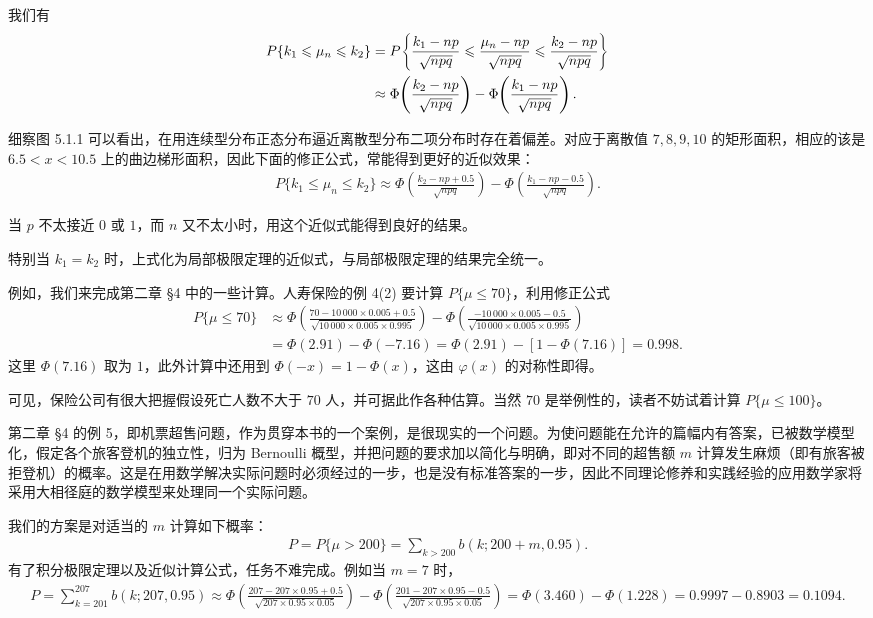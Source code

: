 \documentclass[../../main.tex]{subfiles}
\begin{document}
我们有
\begin{align}
P\{k_1\leqslant\mu_n\leqslant k_2\}
&=P\!\left\{\frac{k_1-np}{\sqrt{npq}}\leqslant\frac{\mu_n-np}{\sqrt{npq}}\leqslant\frac{k_2-np}{\sqrt{npq}}\right\}\notag\\
&\approx\Phi\!\left(\frac{k_2-np}{\sqrt{npq}}\right)-\Phi\!\left(\frac{k_1-np}{\sqrt{npq}}\right).
\end{align}

细察图 5.1.1 可以看出，在用连续型分布正态分布逼近离散型分布二项分布时存在着偏差。对应于离散值 $7,8,9,10$ 的矩形面积，相应的该是 $6.5<x<10.5$ 上的曲边梯形面积，因此下面的修正公式，常能得到更好的近似效果：
\begin{align}
P\{k_1\leqslant\mu_n\leqslant k_2\}
\approx\Phi\!\left(\frac{k_2-np+0.5}{\sqrt{npq}}\right)-\Phi\!\left(\frac{k_1-np-0.5}{\sqrt{npq}}\right).
\end{align}

当 $p$ 不太接近 $0$ 或 $1$，而 $n$ 又不太小时，用这个近似式能得到良好的结果。

特别当 $k_1=k_2$ 时，上式化为局部极限定理的近似式，与局部极限定理的结果完全统一。

例如，我们来完成第二章 \S4 中的一些计算。人寿保险的例 4(2) 要计算 $P\{\mu\leqslant70\}$，利用修正公式
\begin{align*}
P\{\mu\leqslant70\}
&\approx\Phi\!\left(\frac{70-10\,000\times0.005+0.5}{\sqrt{10\,000\times0.005\times0.995}}\right)-\Phi\!\left(\frac{-10\,000\times0.005-0.5}{\sqrt{10\,000\times0.005\times0.995}}\right)\\
&=\Phi(2.91)-\Phi(-7.16)=\Phi(2.91)-[1-\Phi(7.16)]=0.998.
\end{align*}
这里 $\Phi(7.16)$ 取为 $1$，此外计算中还用到 $\Phi(-x)=1-\Phi(x)$，这由 $\varphi(x)$ 的对称性即得。

可见，保险公司有很大把握假设死亡人数不大于 $70$ 人，并可据此作各种估算。当然 $70$ 是举例性的，读者不妨试着计算 $P\{\mu\leqslant100\}$。

第二章 \S4 的例 5，即机票超售问题，作为贯穿本书的一个案例，是很现实的一个问题。为使问题能在允许的篇幅内有答案，已被数学模型化，假定各个旅客登机的独立性，归为 Bernoulli 概型，并把问题的要求加以简化与明确，即对不同的超售额 $m$ 计算发生麻烦（即有旅客被拒登机）的概率。这是在用数学解决实际问题时必须经过的一步，也是没有标准答案的一步，因此不同理论修养和实践经验的应用数学家将采用大相径庭的数学模型来处理同一个实际问题。

我们的方案是对适当的 $m$ 计算如下概率：
\begin{align}
P=P\{\mu>200\}=\sum_{k>200}b(k;200+m,0.95).
\end{align}
有了积分极限定理以及近似计算公式，任务不难完成。例如当 $m=7$ 时，
\begin{align*}
P=\sum_{k=201}^{207}b(k;207,0.95)
\approx\Phi\!\left(\frac{207-207\times0.95+0.5}{\sqrt{207\times0.95\times0.05}}\right)
-\Phi\!\left(\frac{201-207\times0.95-0.5}{\sqrt{207\times0.95\times0.05}}\right)
=\Phi(3.460)-\Phi(1.228)=0.9997-0.8903=0.1094.
\end{align*}
\end{document}
